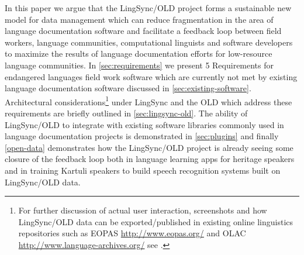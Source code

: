 \documentclass[11pt]{article}
\begin{document}
In this paper we argue that the LingSync/OLD project forms a sustainable new model for data management which can reduce fragmentation in the area of language documentation software 
and facilitate a feedback loop between field workers, language communities, computational linguists and software developers to maximize the results of language documentation efforts for low-resource language communities.
In \autoref{sec:requirements} we present 5 Requirements for 
endangered languages field work  software  which
are currently not met by existing language documentation software discussed in \autoref{sec:existing-software}.  Architectural considerations\footnote{For further discussion of actual user interaction, screenshots and how
LingSync/OLD data can be exported/published in existing online linguistics
repositories such as EOPAS %
\url{http://www.eopas.org/} %
and OLAC %
\url{http://www.language-archives.org/} %
see \cite{lingsync:2012}. }
 under LingSync and the OLD which address these requirements are briefly outlined in \autoref{sec:lingsync-old}. 
 The ability of LingSync/OLD to integrate with existing software libraries commonly used in language documentation projects is demonstrated in \autoref{sec:plugins} and finally \autoref{open-data} 
 demonstrates how the LingSync/OLD project is already seeing some closure of the feedback loop both in language learning apps for heritage speakers and in training Kartuli speakers to build speech recognition systems built on LingSync/OLD data. 
 
\end{document}
